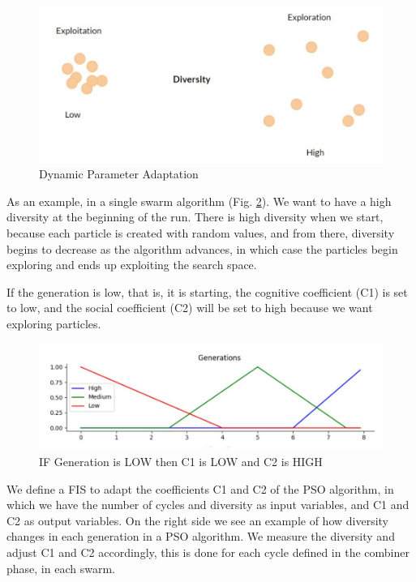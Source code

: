 \documentclass[runningheads]{llncs}
\begin{document}
\begin{figure}
  \centering
  \includegraphics[angle=0,width=1\textwidth]{diversity}
  \caption{Dynamic Parameter Adaptation}
  \label{fig:diversity} 
\end{figure}


As an example, in a single swarm algorithm (Fig. \ref{fig:generation}).
We want to have a high diversity at the beginning of the run.  There is high diversity when we start, because each particle is created with random values, and from there, diversity  begins to decrease as the algorithm advances, in which case the particles begin exploring and ends up exploiting the search space.

If the generation is low, that is, it is starting, the cognitive coefficient (C1) is set to low, and the social coefficient (C2) will be set to high because we want exploring  particles.

\begin{figure}
  \centering
  \includegraphics[angle=0,width=1\textwidth]{FM generation.pdf}
  \caption{IF Generation is LOW then C1 is LOW and C2 is HIGH}
  \label{fig:generation} 
\end{figure}

We define a FIS to adapt the coefficients C1 and C2 of the PSO algorithm, in which we have the number of cycles and diversity as input variables, and C1 and C2 as output variables.
On the right side we see an example of how diversity changes in each generation in a PSO algorithm. We measure the diversity and adjust C1 and C2 accordingly, this is done for each cycle defined in the combiner phase, in each swarm.
\end{document}
